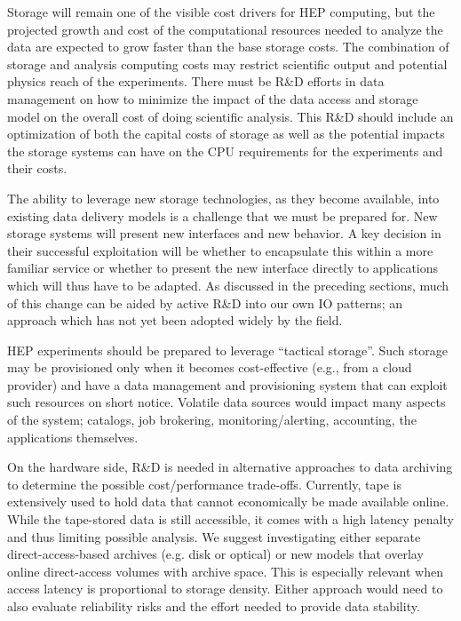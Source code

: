 \documentclass[12pt,a4paper]{article}
\begin{document}
Storage will remain one of the visible cost drivers for HEP computing,
but the projected growth and cost of the computational resources needed
to analyze the data are expected to grow faster than the base storage
costs. The combination of storage and analysis computing costs may
restrict scientific output and potential physics reach of the
experiments. There must be R\&D efforts in data management on how to
minimize the impact of the data access and storage model on the overall
cost of doing scientific analysis. This R\&D should include an
optimization of both the capital costs of storage as well as the
potential impacts the storage systems can have on the CPU requirements
for the experiments and their costs.

The ability to leverage new storage technologies, as they become
available, into existing data delivery models is a challenge that we must
be prepared for. New storage systems will present new interfaces and new
behavior. A key decision in their successful exploitation will be
whether to encapsulate this within a more familiar service or whether to
present the new interface directly to applications which will thus have
to be adapted. As discussed in the preceding sections, much of this
change can be aided by active R\&D into our own IO patterns; an approach
which has not yet been adopted widely by the field.

HEP experiments should be prepared to leverage ``tactical storage''.
Such storage may be provisioned only when it becomes cost-effective
(e.g.,
%
%
from a cloud provider) and have a data management and provisioning
system that can exploit such resources on short notice. Volatile data
%
%
sources would impact many aspects of the system; catalogs, job
brokering, monitoring/alerting, accounting, the applications themselves.

On the hardware side, R\&D is needed in alternative approaches to data
archiving to determine the possible cost/performance trade-offs.
Currently, tape is extensively used to hold data that cannot economically be made available online. While the tape-stored data is still accessible,
it comes with a high latency penalty and thus limiting possible analysis. We suggest investigating either separate direct-access-based archives (e.g.
disk or optical) or new models that overlay online direct-access volumes
with archive space. This is especially relevant when access latency is
proportional to storage density. Either approach would need to also
evaluate reliability risks and the effort needed to provide data
stability.
%
%
\end{document}
